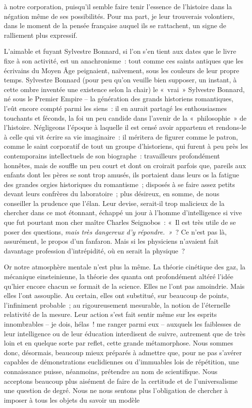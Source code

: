 \documentclass[french,twoside]{book} %
\begin{document}
\label{pXVI} à notre corporation, puisqu’il semble faire tenir l’essence de l’histoire dans la négation même de ses possibilités. Pour ma part, je leur trouverais volontiers, dans le moment de la pensée française auquel ils se rattachent, un signe de ralliement plus expressif.\par
L’aimable et fuyant Sylvestre Bonnard, si l’on s’en tient aux dates que le livre fixe à son activité, est un anachronisme : tout comme ces saints antiques que les écrivains du Moyen Âge peignaient, naïvement, sous les couleurs de leur propre temps. Sylvestre Bonnard (pour peu qu’on veuille bien supposer, un instant, à cette ombre inventée une exis­tence selon la chair) le « vrai » Sylvestre Bonnard, né sous le Premier Empire – la génération des grands historiens romantiques, l’eût encore compté parmi les siens : il en aurait partagé les enthousiasmes touchants et féconds, la foi un peu candide dans l’avenir de la « philosophie » de l’histoire. Négligeons l’époque à laquelle il est censé avoir appartenu et rendons‑le à celle qui vit écrire sa vie imaginaire : il méritera de figurer comme le patron, comme le saint corporatif de tout un groupe d’historiens, qui furent à peu près les contemporains intellectuels de son biographe : travailleurs profondément honnêtes, mais de souffle un peu court et dont on croirait parfois que, pareils aux enfants dont les pères se sont trop amusés, ils portaient dans leurs os la fatigue des grandes orgies historiques du romantisme ; disposés à se faire assez petits devant leurs confrères du laboratoire ; plus désireux, en somme, de nous conseiller la prudence que l’élan. Leur devise, serait‑il trop malicieux de la chercher dans ce mot étonnant, échappé un jour à l’homme d’intelligence si vive que fut pourtant mon cher maître Charles Seignobos : « Il est très utile de se poser des questions, \emph{mais très dangereux d’y répondre. »} ? Ce n’est pas là, assurément, le propos d’un fanfaron. Mais si les physiciens n’avaient fait davantage profession d’intrépidité, où en serait la physique ?\par
Or notre atmosphère mentale n’est plus la même. La théorie cinétique des gaz, la mécanique einsteinienne, la théorie des quanta ont profon­dément altéré l’idée qu’hier encore chacun se formait de la science. Elles ne l’ont pas amoindrie. Mais elles l’ont assouplie. Au certain, elles ont substitué, sur beaucoup de points, l’infiniment probable ; au rigoureu­sement mesurable, la notion de l’éternelle relativité de la mesure. Leur action s’est fait sentir même sur les esprits innombrables – je dois, hélas ! me ranger parmi eux – auxquels les faiblesses de leur intelligence ou de leur éducation interdisent de suivre, autrement que de très loin et en quelque sorte par reflet, cette grande métamorphose. Nous sommes donc, désormais, beaucoup mieux préparés à admettre que, pour ne pas s’avérer capables de démonstrations euclidiennes ou d’immuables lois de répéti­tion, une connaissance puisse, néanmoins, prétendre au nom de scienti­fique. Nous acceptons beaucoup plus aisément de faire de la certitude et de l’universalisme une question de degré. Nous ne nous sentons plus l’obligation de chercher à imposer à tous les objets du savoir un modèle  
\end{document}
